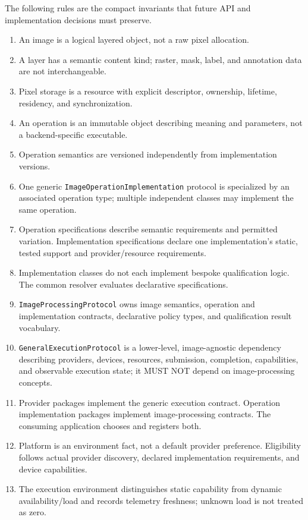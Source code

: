 \documentclass[11pt,a4paper,oneside]{article}
\begin{document}
The following rules are the compact invariants that future API and implementation decisions must preserve.
\begin{enumerate}
  \item An image is a logical layered object, not a raw pixel allocation.
  \item A layer has a semantic content kind; raster, mask, label, and annotation data are not interchangeable.
  \item Pixel storage is a resource with explicit descriptor, ownership, lifetime, residency, and synchronization.
  \item An operation is an immutable object describing meaning and parameters, not a backend-specific executable.
  \item Operation semantics are versioned independently from implementation versions.
  \item One generic \texttt{ImageOperationImplementation} protocol is specialized by an associated operation type; multiple independent classes may implement the same operation.
  \item Operation specifications describe semantic requirements and permitted variation. Implementation specifications declare one implementation's static, tested support and provider/resource requirements.
  \item Implementation classes do not each implement bespoke qualification logic. The common resolver evaluates declarative specifications.
  \item \texttt{ImageProcessing\allowbreak Protocol} owns image semantics, operation and implementation contracts, declarative policy types, and qualification result vocabulary.
  \item \texttt{GeneralExecution\allowbreak Protocol} is a lower-level, image-agnostic dependency describing providers, devices, resources, submission, completion, capabilities, and observable execution state; it MUST NOT depend on image-processing concepts.
  \item Provider packages implement the generic execution contract. Operation implementation packages implement image-processing contracts. The consuming application chooses and registers both.
  \item Platform is an environment fact, not a default provider preference. Eligibility follows actual provider discovery, declared implementation requirements, and device capabilities.
  \item The execution environment distinguishes static capability from dynamic availability/load and records telemetry freshness; unknown load is not treated as zero.

\end{enumerate}
\end{document}
